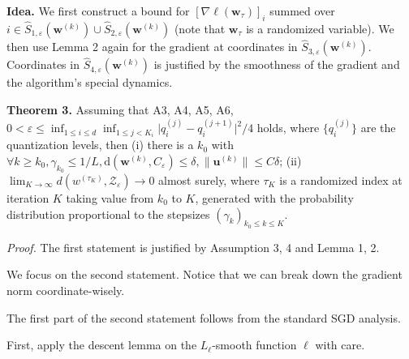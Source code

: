 \documentclass[10pt,a4paper]{article}
\begin{document}
\textbf{Idea.} We first construct a bound for $[\nabla\ell(\mathbf{w}_\tau)]_i$ summed over $i\in \hat{S}_{1,\varepsilon}(\mathbf{w}^{(k)})\cup \hat{S}_{2,\varepsilon}(\mathbf{w}^{(k)})$ (note that $\mathbf{w}_\tau$ is a randomized variable). We then use Lemma 2 again for the gradient at coordinates in $\hat{S}_{3,\varepsilon}(\mathbf{w}^{(k)})$. Coordinates in $\hat{S}_{4,\varepsilon}(\mathbf{w}^{(k)})$ is justified by the smoothness of the gradient and the algorithm's special dynamics.

\newpage

\textbf{Theorem 3.} Assuming that A3, A4, A5, A6, $0<\varepsilon\leq \inf_{1\leq i\leq d}\inf_{1\leq j< K_i} \lvert q^{(j)}_i - q^{(j+1)}_i\rvert^2/4$ holds, where $\{q^{(j)}_i\}$ are the quantization levels, then (i) there is a $k_0$ with $\forall k\geq k_0 ,\gamma_{k_0}\leq 1/L, \text{d}(\mathbf{w}^{(k)}, C_\varepsilon)\leq \delta, \lVert \textbf{u}^{(k)}\rVert \leq C\delta$; (ii) $\lim_{K\to\infty} d(w^{(\tau_K)},\mathcal{Z}_\varepsilon)\to 0$ almost surely, where $\tau_K$ is a randomized index at iteration $K$ taking value from $k_0$ to $K$, generated with the probability distribution proportional to the stepsizes $(\gamma_k)_{k_0\leq k\leq K}$. 


\textit{Proof.} The first statement is justified by Assumption 3, 4 and Lemma 1, 2. 

We focus on the second statement. Notice that we can break down the gradient norm coordinate-wisely. 

The first part of the second statement follows from the standard SGD analysis. 

First, apply the descent lemma on the $L_\ell$-smooth function $\ell$ with care. 
\end{document}
